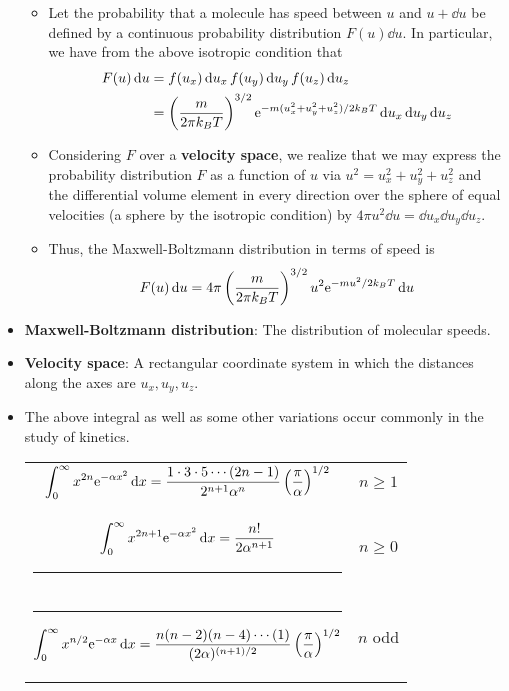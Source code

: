 \documentclass[../notes.tex]{subfiles}
\begin{document}
\begin{itemize}
    \begin{itemize}
        \item Let the probability that a molecule has speed between $u$ and $u+\dd{u}$ be defined by a continuous probability distribution $F(u)\dd{u}$. In particular, we have from the above isotropic condition that
        \begin{align*}
            F(u)\dd{u} &= f(u_x)\dd{u_x}f(u_y)\dd{u_y}f(u_z)\dd{u_z}\\
            &= \left( \frac{m}{2\pi k_BT} \right)^{3/2}\e[-m(u_x^2+u_y^2+u_z^2)/2k_BT]\dd{u_x}\dd{u_y}\dd{u_z}
        \end{align*}
        \item Considering $F$ over a \textbf{velocity space}, we realize that we may express the probability distribution $F$ as a function of $u$ via $u^2=u_x^2+u_y^2+u_z^2$ and the differential volume element in every direction over the sphere of equal velocities (a sphere by the isotropic condition) by $4\pi u^2\dd{u}=\dd{u_x}\dd{u_y}\dd{u_z}$.
        \item Thus, the Maxwell-Boltzmann distribution in terms of speed is
        \begin{equation*}
            F(u)\dd{u} = 4\pi\left( \frac{m}{2\pi k_BT} \right)^{3/2}u^2\e[-mu^2/2k_BT]\dd{u}
        \end{equation*}
    \end{itemize}
    \item \textbf{Maxwell-Boltzmann distribution}: The distribution of molecular speeds.
    \item \textbf{Velocity space}: A rectangular coordinate system in which the distances along the axes are $u_x,u_y,u_z$.
    \item The above integral as well as some other variations occur commonly in the study of kinetics.
    \begin{table}[H]
        \centering
        \small
        \renewcommand{\arraystretch}{2.2}
        \begin{tabular}{cc}
            \toprule
            $\displaystyle\int_0^\infty x^{2n}\e[-\alpha x^2]\dd{x}=\frac{1\cdot 3\cdot 5\cdots(2n-1)}{2^{n+1}\alpha^n}\left( \frac{\pi}{\alpha} \right)^{1/2}$ & $n\geq 1$\\
            $\displaystyle\int_0^\infty x^{2n+1}\e[-\alpha x^2]\dd{x}=\frac{n!}{2\alpha^{n+1}}$\rule{3.2cm}{0pt} & $n\geq 0$\\
            \rule{5mm}{0pt}$\displaystyle\int_0^\infty x^{n/2}\e[-\alpha x]\dd{x}=\frac{n(n-2)(n-4)\cdots(1)}{(2\alpha)^{(n+1)/2}}\left( \frac{\pi}{\alpha} \right)^{1/2}$ & $n$ odd\\

\end{tabular}
\end{table}
\end{itemize}
\end{document}
